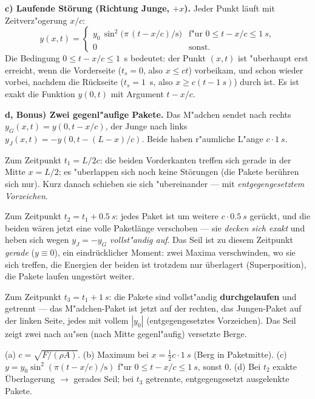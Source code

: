 \textbf{c) Laufende Störung (Richtung Junge, $+x$).} Jeder Punkt läuft mit
Zeitverz"ogerung $x/c$:
\begin{equation}
  y(x,t)=\begin{cases}
    y_0\,\sin^2\!\bigl(\pi\,(t-x/c)/\mathrm{s}\bigr)
      & \text{f"ur } 0\le t-x/c\le\qty{1}{s},\\
    0 & \text{sonst}.
  \end{cases}
\end{equation}
Die Bedingung $0\le t-x/c\le1$~s bedeutet: der Punkt $(x,t)$ ist "uberhaupt
erst erreicht, wenn die Vorderseite ($t_s=0$, also $x\le ct$) vorbeikam, und
schon wieder vorbei, nachdem die Rückseite ($t_s=1$~s, also $x\ge c(t-1~s)$)
durch ist. Es ist exakt die Funktion $y(0,t)$ mit Argument $t-x/c$.

\textbf{d, Bonus) Zwei gegenl"aufige Pakete.} Das M"adchen sendet nach
rechts $y_G(x,t)=y(0,t-x/c)$, der Junge nach links
$y_J(x,t)=-y(0,t-(L-x)/c)$. Beide haben r"aumliche L"ange $c\cdot\qty{1}{s}$.

Zum Zeitpunkt $t_1=L/2c$: die beiden Vorderkanten treffen sich gerade in der
Mitte $x=L/2$; es "uberlappen sich noch keine Störungen (die Pakete berühren
sich nur). Kurz danach schieben sie sich "ubereinander --- mit
\emph{entgegengesetztem Vorzeichen}.

Zum Zeitpunkt $t_2=t_1+\qty{0.5}{s}$: jedes Paket ist um weitere
$c\cdot\qty{0.5}{s}$ gerückt, und die beiden wären jetzt eine volle
Paketlänge verschoben --- sie \emph{decken sich exakt} und heben sich wegen
$y_J=-y_G$ \emph{vollst"andig auf}. Das Seil ist zu diesem Zeitpunkt
\emph{gerade} ($y\equiv0$), ein eindrücklicher Moment: zwei Maxima
verschwinden, wo sie sich treffen, die Energien der beiden ist trotzdem nur
überlagert (Superposition), die Pakete laufen ungestört weiter.

Zum Zeitpunkt $t_3=t_1+\qty{1}{s}$: die Pakete sind vollst"andig
\textbf{durchgelaufen} und getrennt --- das M"adchen-Paket ist jetzt auf der
rechten, das Jungen-Paket auf der linken Seite, jedes mit vollem $|y_0|$
(entgegengesetztes Vorzeichen). Das Seil zeigt zwei nach au"sen (nach Mitte
gegenl"aufig) versetzte Berge.

\begin{ergebnis}
(a) $c=\sqrt{F/(\rho A)}$. (b) Maximum bei $x=\frac12 c\cdot\qty{1}{s}$
(Berg in Paketmitte). (c) $y=y_0\sin^2(\pi(t-x/c)/\mathrm{s})$ f"ur
$0\le t-x/c\le\qty{1}{s}$, sonst $0$. (d) Bei $t_2$ exakte Überlagerung
$\rightarrow$ gerades Seil; bei $t_3$ getrennte, entgegengesetzt ausgelenkte
Pakete.
\end{ergebnis}

